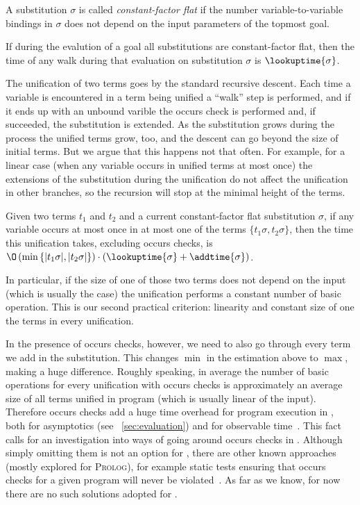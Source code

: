 \begin{definition}
A substitution $\sigma$ is called \emph{constant-factor flat} if the number variable-to-variable bindings in $\sigma$ does not depend on the input parameters of the topmost goal.
\end{definition}

\begin{lemma}
If during the evalution of a goal all substitutions are constant-factor flat, then the time of any walk during that evaluation on substitution $\sigma$ is $\lookuptime{\sigma}$.
\end{lemma}

The unification of two terms goes by the standard recursive descent. Each time a variable is encountered in a term being unified a ``walk'' step is performed, and if it ends up with
an unbound varible the occurs check is performed and, if succeeded, the substitution is extended. As the substitution grows during the process  the unified terms grow,
too, and the descent can go beyond the size of initial terms. But we argue that this happens not that often. For example, for a linear case (when any variable occurs in unified terms at
most once) the extensions of the substitution during the unification do not affect the unification in other branches, so the recursion will stop at the minimal height of the terms. 

\begin{lemma}
  Given two terms $t_1$ and $t_2$ and a current constant-factor flat substitution $\sigma$, if any variable occurs at most once in at most one of the terms $\{t_1 \sigma, t_2 \sigma\}$,
  then the time this unification takes, excluding occurs checks, is $\O\,(\min\,\{|t_1 \sigma|, |t_2 \sigma|\}) \cdot (\lookuptime{\sigma} + \addtime{\sigma})$.
\end{lemma}

In particular, if the size of one of those two terms does not depend on the input (which is usually the case) the unification performs a constant number of basic operation.
This is our second practical criterion: linearity and constant size of one the terms in every unification.

In the presence of occurs checks, however, we need to also go through every term we add in the substitution. This changes $\min$ in the estimation above to $\max$, making a huge
difference. Roughly speaking, in average the number of basic operations for every unification with occurs checks is approximately an average size of all terms unified in program
(which is usually linear of the input). Therefore occurs checks add a huge time overhead for program execution in \mK, both for asymptotics (see \sectionword~\ref{sec:evaluation})
and for observable time~\cite{WillThesis}. This fact calls for an investigation into ways of going around occurs checks in \mK. Although simply omitting them is not an option for \mK,
there are other known approaches (mostly explored for \textsc{Prolog}), for example static tests ensuring that occurs checks for a given program will never be violated~\cite{OccursCheckStaticTest}.
As far as we know, for now there are no such solutions adopted for \mK.

